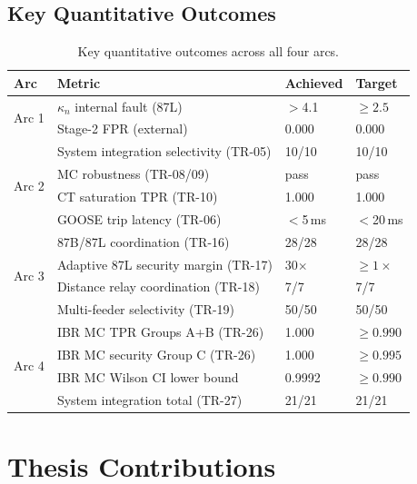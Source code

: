 \documentclass[11pt,a4paper]{article}
\begin{document}
\subsection{Key Quantitative Outcomes}

\begin{table}[h!]
\centering
\caption{Key quantitative outcomes across all four arcs.}
\label{tab:summary}
\setlength{\tabcolsep}{4pt}
\begin{tabular}{llll}
\toprule
Arc & Metric & Achieved & Target \\
\midrule
\multirow{2}{*}{Arc 1} &
  $\kappa_n$ internal fault (87L) & $>$4.1 & $\geq 2.5$ \\
& Stage-2 FPR (external)         & 0.000  & 0.000 \\[2pt]
\multirow{4}{*}{Arc 2} &
  System integration selectivity (TR-05) & 10/10  & 10/10 \\
& MC robustness (TR-08/09)               & pass   & pass  \\
& CT saturation TPR (TR-10)              & 1.000  & 1.000 \\
& GOOSE trip latency (TR-06)             & $<$5\,ms & $<$20\,ms \\[2pt]
\multirow{4}{*}{Arc 3} &
  87B/87L coordination (TR-16) & 28/28  & 28/28 \\
& Adaptive 87L security margin (TR-17)   & 30$\times$ & $\geq 1\times$ \\
& Distance relay coordination (TR-18)    & 7/7    & 7/7 \\
& Multi-feeder selectivity (TR-19)       & 50/50  & 50/50 \\[2pt]
\multirow{4}{*}{Arc 4} &
  IBR MC TPR Groups A+B (TR-26) & 1.000  & $\geq 0.990$ \\
& IBR MC security Group C (TR-26)     & 1.000  & $\geq 0.995$ \\
& IBR MC Wilson CI lower bound        & 0.9992 & $\geq 0.990$ \\
& System integration total (TR-27)    & 21/21  & 21/21 \\
\bottomrule
\end{tabular}
\end{table}

\section{Thesis Contributions}
\end{document}
